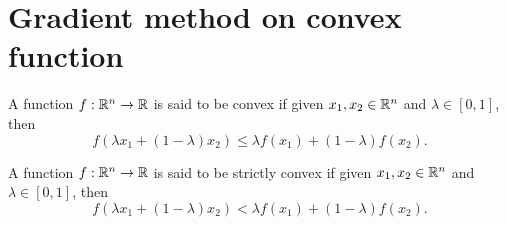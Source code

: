 \documentclass[10pt,a4paper]{article}
\begin{document}
\section{Gradient method on convex function}
\begin{definition}
	A function $f:\mathbb{R}^n\to \mathbb{R}$ is said to be convex if given $x_1,x_2\in \mathbb{R}^n$ and $\lambda\in [0,1]$, then 
	\begin{equation*}
		f(\lambda x_1 +(1-\lambda) x_2) \leq \lambda f(x_1) +(1-\lambda) f(x_2).
	\end{equation*}
\end{definition}
\begin{definition}
	A function $f:\mathbb{R}^n\to \mathbb{R}$ is said to be strictly convex if given $x_1,x_2\in \mathbb{R}^n$ and $\lambda\in [0,1]$, then 
	\begin{equation*}
		f(\lambda x_1 +(1-\lambda) x_2) < \lambda f(x_1) +(1-\lambda) f(x_2).
	\end{equation*}
\end{definition}
\end{document}
